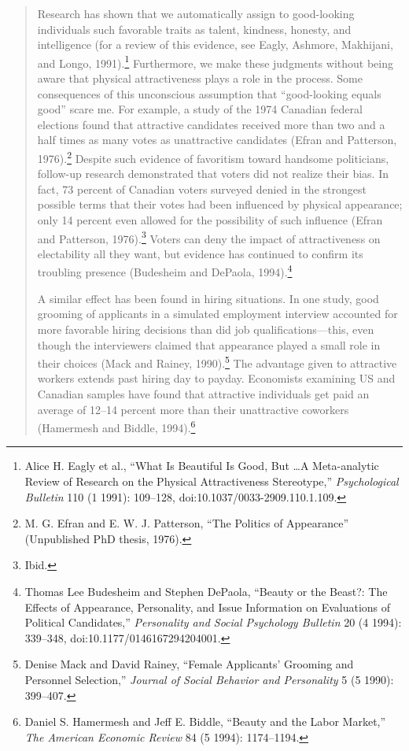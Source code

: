 \begin{quotation}
{
 Research has shown that we automatically assign to good-looking
individuals such favorable traits as talent, kindness, honesty, and
intelligence (for a review of this evidence, see Eagly, Ashmore,
Makhijani, and Longo, 1991).\footnote{Alice H. Eagly et al., ``What Is Beautiful Is
Good, But \ldots A Meta-analytic Review of Research on the Physical
Attractiveness Stereotype,'' \textit{Psychological
Bulletin} 110 (1 1991): 109--128, doi:10.1037/0033-2909.110.1.109.} Furthermore, we make
these judgments without being aware that physical attractiveness plays
a role in the process. Some consequences of this unconscious assumption
that ``good-looking equals good''
scare me. For example, a study of the 1974 Canadian federal elections
found that attractive candidates received more than two and a half
times as many votes as unattractive candidates (Efran and Patterson,
1976).\footnote{M. G. Efran and E. W. J. Patterson, ``The
Politics of Appearance'' (Unpublished PhD thesis,
1976).} Despite such evidence of favoritism toward
handsome politicians, follow-up research demonstrated that voters did
not realize their bias. In fact, 73 percent of Canadian voters surveyed
denied in the strongest possible terms that their votes had been
influenced by physical appearance; only 14 percent even allowed for the
possibility of such influence (Efran and Patterson,
1976).\footnote{Ibid.} Voters can deny the impact of attractiveness
on electability all they want, but evidence has continued to confirm
its troubling presence (Budesheim and DePaola,
1994).\footnote{Thomas Lee Budesheim and Stephen DePaola,
``Beauty or the Beast?: The Effects of Appearance,
Personality, and Issue Information on Evaluations of Political
Candidates,'' \textit{Personality and Social
Psychology Bulletin} 20 (4 1994): 339--348,
doi:10.1177/0146167294204001.}}

{
 A similar effect has been found in hiring situations. In one
study, good grooming of applicants in a simulated employment interview
accounted for more favorable hiring decisions than did job
qualifications---this, even though the interviewers claimed that
appearance played a small role in their choices (Mack and Rainey,
1990).\footnote{Denise Mack and David Rainey, ``Female
Applicants' Grooming and Personnel
Selection,'' \textit{Journal of Social Behavior and
Personality} 5 (5 1990): 399--407.} The advantage given to attractive workers
extends past hiring day to payday. Economists examining US and Canadian
samples have found that attractive individuals get paid an average of
12--14 percent more than their unattractive coworkers (Hamermesh and
Biddle, 1994).\footnote{Daniel S. Hamermesh and Jeff E. Biddle,
``Beauty and the Labor Market,''
\textit{The American Economic Review} 84 (5 1994): 1174--1194.}}


\end{quotation}
